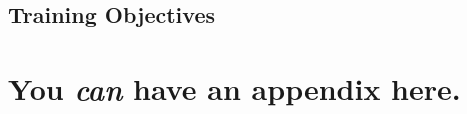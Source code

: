 \documentclass{article}
\theoremstyle{plain}
\theoremstyle{definition}
\theoremstyle{remark}
\begin{document}
\subsection{Training Objectives}











\newpage
\appendix
\onecolumn
\section{You \emph{can} have an appendix here.}
\end{document}

